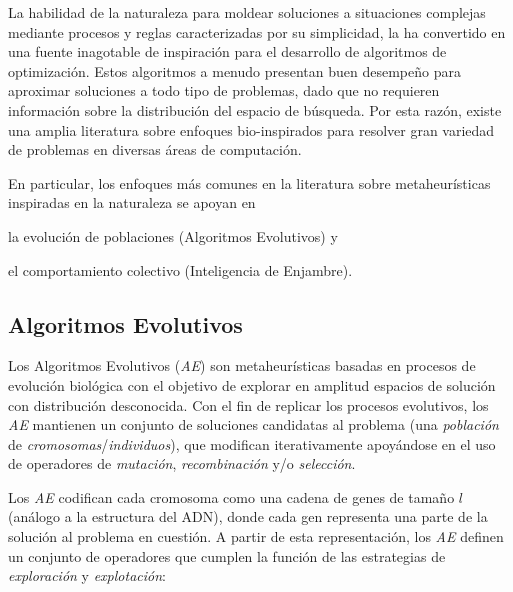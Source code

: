 La habilidad de la naturaleza para moldear soluciones a situaciones complejas mediante procesos y reglas caracterizadas por su simplicidad, la ha convertido en una fuente inagotable de inspiración para el desarrollo de algoritmos de optimización. Estos algoritmos a menudo presentan buen desempeño para aproximar soluciones a todo tipo de problemas, dado que no requieren información sobre la distribución del espacio de búsqueda. Por esta razón, existe una amplia literatura sobre enfoques bio-inspirados \cite{binitha2012survey} para resolver gran variedad de problemas en diversas áreas de computación.

En particular, los enfoques más comunes en la literatura sobre metaheurísticas inspiradas en la naturaleza se apoyan en
\begin{inparaenum}
\item la evolución de poblaciones (Algoritmos Evolutivos) y
\item el comportamiento colectivo (Inteligencia de Enjambre).
\end{inparaenum}

\subsection{Algoritmos Evolutivos}

Los Algoritmos Evolutivos (\emph{AE}) son metaheurísticas basadas en procesos de evolución biológica con el objetivo de explorar en amplitud espacios de solución con distribución desconocida. Con el fin de replicar los procesos evolutivos, los \emph{AE} mantienen un conjunto de soluciones candidatas al problema (una \emph{población} de \emph{cromosomas}/\emph{individuos}), que modifican iterativamente apoyándose en el uso de operadores de \emph{mutación}, \emph{recombinación} y/o \emph{selección}.

Los \emph{AE} codifican cada cromosoma como una cadena de genes de tamaño $l$ (análogo a la estructura del ADN), donde cada gen representa una parte de la solución al problema en cuestión. A partir de esta representación, los \emph{AE} definen un conjunto de operadores que cumplen la función de las estrategias de \emph{exploración} y \emph{explotación}:


